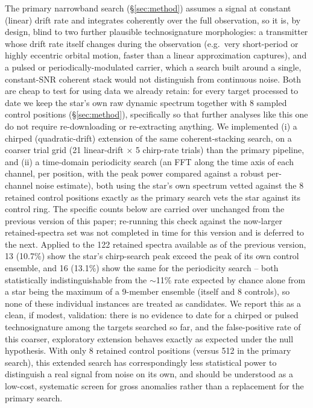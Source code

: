 \documentclass{openjournal}
\begin{document}
The primary narrowband search (\S\ref{sec:method}) assumes a signal at
constant (linear) drift rate and integrates coherently over the full
observation, so it is, by design, blind to two further plausible
technosignature morphologies: a transmitter whose drift rate itself
changes during the observation (e.g.\ very short-period or highly
eccentric orbital motion, faster than a linear approximation captures),
and a pulsed or periodically-modulated carrier, which a search built
around a single, constant-SNR coherent stack would not distinguish from
continuous noise. Both are cheap to test for using data we already
retain: for every target processed to date we keep the star's own raw
dynamic spectrum together with 8 sampled control positions
(\S\ref{sec:method}), specifically so that further analyses like this
one do not require re-downloading or re-extracting anything. We
implemented (i) a chirped (quadratic-drift) extension of the same
coherent-stacking search, on a coarser trial grid (21 linear-drift $\times$
5 chirp-rate trials) than the primary pipeline, and (ii) a time-domain
periodicity search (an FFT along the time axis of each channel, per
position, with the peak power compared against a robust per-channel
noise estimate), both using the star's own spectrum vetted against the 8
retained control positions exactly as the primary search vets the star
against its control ring. The specific counts below are carried over
unchanged from the previous version of this paper; re-running this check
against the now-larger retained-spectra set was not completed in time
for this version and is deferred to the next. Applied to the 122
retained spectra available as of the previous version, 13 (10.7\%) show
the star's chirp-search peak
exceed the peak of its own control ensemble, and 16 (13.1\%) show the same
for the periodicity search -- both statistically indistinguishable from
the $\sim$11\% rate expected by chance alone from a star being the
maximum of a 9-member ensemble (itself and 8 controls), so none of these
individual instances are treated as candidates. We report this as a
clean, if modest, validation: there is no evidence to date for a
chirped or pulsed technosignature among the targets searched so far,
and the false-positive rate of this coarser, exploratory extension
behaves exactly as expected under the null hypothesis. With only 8
retained control positions (versus 512 in the primary search), this
extended search has correspondingly less statistical power to
distinguish a real signal from noise on its own, and should be
understood as a low-cost, systematic screen for gross anomalies rather
than a replacement for the primary search.
\end{document}

